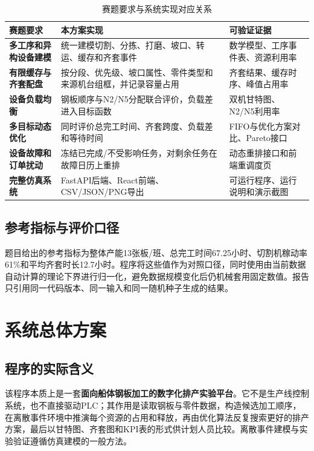 \documentclass[UTF8,zihao=-4,openany]{ctexrep}
\newcommand{\important}[1]{\textbf{#1}}
\begin{document}
\begin{table}[H]
\centering
\caption{赛题要求与系统实现对应关系}
\begin{tabularx}{\textwidth}{>{\bfseries}p{}YY}
\toprule
赛题要求 & 本方案实现 & 可验证证据 \\
\midrule
多工序和异构设备建模 & 统一建模切割、分拣、打磨、坡口、转运、缓存和齐套事件 & 数学模型、工序事件表、资源利用率 \\
有限缓存与齐套配盘 & 按分段、优先级、坡口属性、零件类型和来源机台组框，并记录容量占用 & 齐套结果、缓存时序、峰值占用率 \\
设备负载均衡 & 钢板顺序与N2/N5分配联合评价，负载差进入目标函数 & 双机甘特图、N2/N5利用率 \\
多目标动态优化 & 同时评价总完工时间、齐套跨度、负载差和等待时间 & FIFO与优化方案对比、Pareto接口 \\
设备故障和订单扰动 & 冻结已完成/不受影响任务，对剩余任务在故障日历上重排 & 动态重排接口和前端重调度页 \\
完整仿真系统 & FastAPI后端、React前端、CSV/JSON/PNG导出 & 可运行程序、运行说明和演示截图 \\
\bottomrule
\end{tabularx}
\end{table}

\section{参考指标与评价口径}

题目给出的参考指标为整体产能13张板/班、总完工时间67.25小时、切割机稼动率61\%和平均齐套时长12.7小时。程序将这些值作为对照口径，同时使用由当前数据自动计算的理论下界进行归一化，避免数据规模变化后仍机械套用固定数值。报告只引用同一代码版本、同一输入和同一随机种子生成的结果。

\chapter{系统总体方案}

\section{程序的实际含义}

该程序本质上是一套\important{面向船体钢板加工的数字化排产实验平台}。它不是生产线控制系统，也不直接驱动PLC；其作用是读取钢板与零件数据，构造候选加工顺序，在离散事件环境中推演每个资源的占用和释放，再由优化算法反复搜索更好的排产方案，最后以甘特图、齐套图和KPI表的形式供计划人员比较。离散事件建模与实验验证遵循仿真建模的一般方法\cite{law}。
\end{document}
